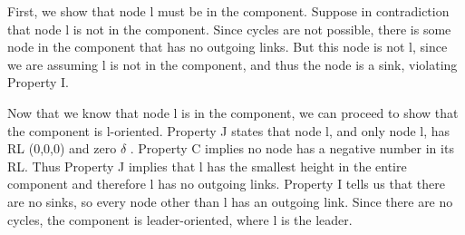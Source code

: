 First, we show that node l must be in the component. Suppose in contradiction that node l is not in the component. Since cycles are not possible, there is some node in the component that has no outgoing links. But this node is not l, since we are assuming l is not in the component, and thus the node is a sink, violating Property I.

Now that we know that node l is in the component, we can proceed to show that the component is l-oriented. Property J states that node l, and only node l, has RL (0,0,0) and zero $\delta$ . Property C implies no node has a negative number in its RL. Thus Property J implies that l has the smallest height in the entire component and therefore l has no outgoing links. Property I tells us that there are no sinks, so every node other than l has an outgoing link. Since there are no cycles, the component is leader-oriented, where l is the leader.